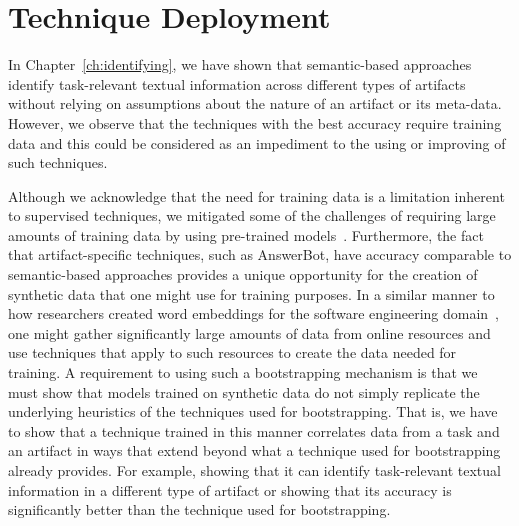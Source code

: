 \section{Technique Deployment}



In Chapter~\ref{ch:identifying}, we have shown that semantic-based approaches identify task-relevant textual information across
different types of artifacts without relying on
assumptions about the nature of an artifact or its meta-data.
However, we
observe that the techniques with the best accuracy require training data
and this could be considered as an impediment to the using or improving of such  techniques. 



Although we acknowledge that the need for training data is a limitation inherent to supervised techniques,
we mitigated some of the challenges of requiring large amounts of training data by using pre-trained models~\cite{erhan2010pre-train}.
Furthermore, the fact that artifact-specific techniques, such as AnswerBot, have accuracy comparable to semantic-based approaches
 provides
a unique opportunity for the creation of synthetic data that one might use for training purposes.
In a similar manner to how researchers created word embeddings for the software engineering domain~\cite{Efstathiou2018}, one might gather significantly large amounts of data from online resources
and use techniques that apply to such resources to create the data needed for training.
A requirement to using such a bootstrapping mechanism is that we must show that models trained on synthetic data do not simply replicate the underlying heuristics of the techniques used for bootstrapping. That is, we have to show that a technique trained
in this manner correlates data from a task and an artifact in ways that
extend beyond what a technique used for bootstrapping already provides. For example, showing that
it can identify task-relevant textual information in a different type of artifact or showing
that its accuracy is significantly better than the technique used for bootstrapping.



